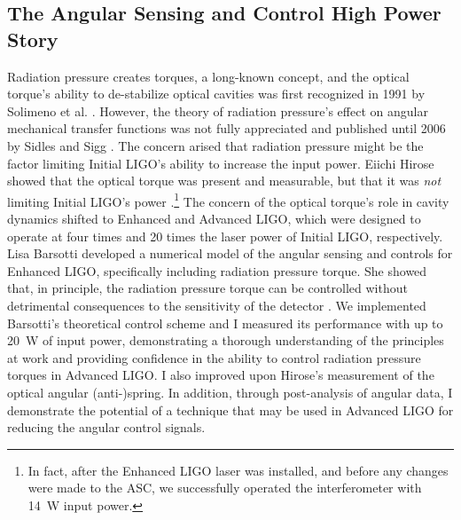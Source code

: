 \subsection{The Angular Sensing and Control High Power Story}
Radiation pressure creates torques, a long-known concept, and the
optical torque's ability to de-stabilize optical cavities was first
recognized in 1991 by Solimeno et
al. \cite{Solimeno1991FabryPerot}. However, the theory of radiation
pressure's effect on angular mechanical transfer functions was not
fully appreciated and published until 2006 by Sidles and Sigg
\cite{Sidles2006Optical}. The concern arised that radiation pressure
might be the factor limiting Initial LIGO's ability to increase the
input power. Eiichi Hirose showed that the optical torque was present
and measurable, but that it was \emph{not} limiting Initial LIGO's
power \cite{Hirose2010Angular}.\footnote{In fact, after the Enhanced
  LIGO laser was installed, and before any changes were made to the
  ASC, we successfully operated the interferometer with 14~W input
  power.} %
The concern of the optical torque's role in cavity dynamics shifted to
Enhanced and Advanced LIGO, which were designed to operate at four
times and 20 times the laser power of Initial LIGO, respectively. Lisa
Barsotti developed a numerical model of the angular sensing and
controls for Enhanced LIGO, specifically including radiation pressure
torque. She showed that, in principle, the radiation pressure torque
can be controlled without detrimental consequences to the sensitivity
of the detector \cite{Barsotti2009Modeling}. We implemented Barsotti's
theoretical control scheme and I measured its performance with up to
20~W of input power, demonstrating a thorough understanding of the
principles at work and providing confidence in the ability to control
radiation pressure torques in Advanced LIGO. I also improved upon
Hirose's measurement of the optical angular (anti-)spring. In
addition, through post-analysis of angular data, I demonstrate the
potential of a technique that may be used in Advanced LIGO for
reducing the angular control signals.



